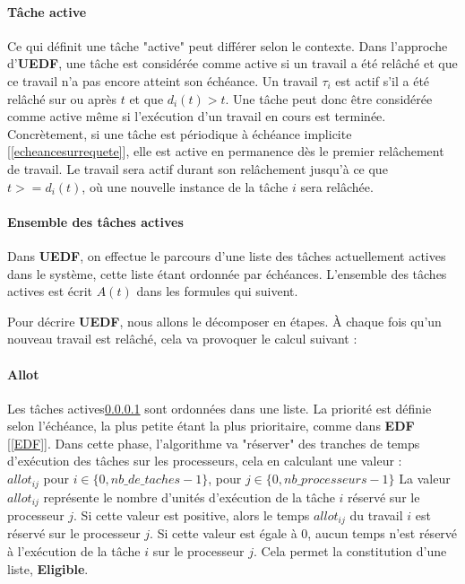 	\paragraph{Tâche active}\label{tacheactive}
	Ce qui définit une tâche "active" peut différer selon le contexte. Dans l'approche d'\textbf{UEDF}, une tâche est 
	considérée comme active si un travail a été relâché et que ce travail n'a pas encore atteint son échéance. 
	Un travail $\tau_i$ est actif s'il a été relâché sur ou après $t$ et que $d_i(t) > t$.
	Une tâche peut donc 
	être considérée comme active même si l'exécution d'un travail en cours est terminée. 
	Concrètement, si une tâche est périodique à échéance implicite [\ref*{echeancesurrequete}], elle est active en permanence dès le 
	premier relâchement de travail. Le travail sera actif durant son relâchement jusqu'à ce que $t >= d_i(t)$, où 
	une nouvelle instance de la tâche $i$ sera relâchée.
	
	
	\paragraph{Ensemble des tâches actives}\label{ensembledestachesactives}
	Dans \textbf{UEDF}, on effectue le parcours d'une liste des tâches actuellement actives dans le système, 
	cette liste étant ordonnée par échéances. 
	 L'ensemble des tâches actives est écrit $A(t)$ dans les formules qui suivent.\newline
	
	Pour décrire \textbf{UEDF}, nous allons le décomposer en étapes.
	À chaque fois qu'un nouveau travail est relâché, cela va provoquer le calcul suivant :\newline
	\paragraph{Allot}
	Les tâches actives\ref*{tacheactive} sont ordonnées dans une liste. La priorité est définie selon l'échéance, 
	la plus petite étant la plus prioritaire, comme dans \textbf{EDF} [\ref*{EDF}].
	Dans cette phase, l'algorithme va "réserver" des tranches de temps d'exécution des tâches sur les 
	processeurs, cela en calculant une valeur : \\
	$allot_{ij}$ pour $i \in \{0, nb\_de\_taches - 1\}$, pour $j \in \{0, nb\_processeurs - 1\}$
	La valeur $allot_{ij}$ représente le nombre d'unités d'exécution de la tâche $i$ réservé sur le processeur $j$.\newline
	Si cette valeur est positive, alors le temps $allot_{ij}$ du travail $i$ est réservé sur le 
	processeur $j$. Si cette valeur est égale à $0$, aucun temps n'est réservé 
	à l'exécution de la tâche $i$ sur le processeur $j$. Cela permet la constitution d'une liste, 
	\textbf{Eligible}.\newline
	
